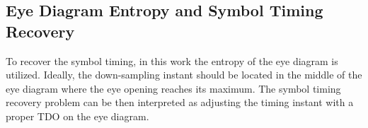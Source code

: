 \documentclass[12pt, draftclsnofoot, onecolumn]{IEEEtran}
\begin{document}
\subsection{Eye Diagram Entropy and Symbol Timing Recovery}
\label{sec:eye_entp}
To recover the symbol timing, in this work the entropy of the eye diagram is utilized. 
Ideally, the down-sampling instant should be located in the middle of the eye diagram where the eye opening reaches its maximum.
The symbol timing recovery problem can be then interpreted as adjusting the timing instant with a proper TDO on the eye diagram.
\end{document}
